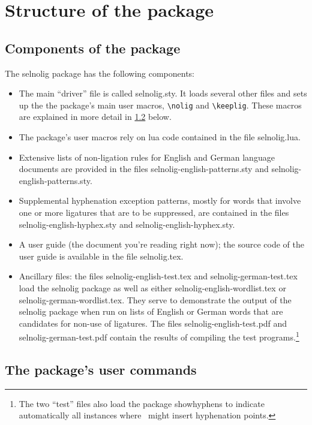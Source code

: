 \documentclass[11pt]{article}
\newcommand{\pkg}[1]{\textsf{#1}}
\newcommand{\cmmd}[1]{\texttt{\textbackslash #1}}
\begin{document}
\section{Structure of the package}

\subsection{Components of the package}

The \pkg{selnolig} package has the following components:
\begin{itemize}
\item The main \enquote{driver} file is called \pkg{selnolig.sty}. It loads several other files and sets up the the package's main user macros, \cmmd{nolig} and \cmmd{keeplig}. These macros are explained in more detail in \cref{sec:syntax} below.
\item The package's user macros rely on lua code contained in the file \pkg{selnolig.lua}. 
\item Extensive lists of non-ligation rules for English and German language documents are provided in the files \pkg{selnolig-english-patterns.sty} and \pkg{selnolig-english-patterns.sty}. 
\item Supplemental hyphenation exception patterns, mostly for words that involve one or more ligatures that are to be suppressed, are contained in the files \pkg{selnolig-english-hyphex.sty} and \pkg{selnolig-english-hyphex.sty}.
\item A user guide (the document you're reading right now); the source code of the user guide is available in the file \pkg{selnolig.tex}. 

\item Ancillary files: the files \pkg{selnolig-english-test.tex} and \pkg{selnolig-german-test.tex} load the \pkg{selnolig} package as well as either \pkg{selnolig-english-wordlist.tex} or \pkg{selnolig-german-wordlist.tex}. They serve to demonstrate the output of the \pkg{selnolig} package when run on lists of English or German words that are candidates for non-use of ligatures. The files \pkg{selnolig-english-test.pdf} and \pkg{selnolig-german-test.pdf} contain the results of compiling the test programs.\footnote{The two \enquote{test} files also load the package \pkg{showhyphens} to indicate automatically all instances where \LuaLaTeX\ might insert hyphenation points.}

\end{itemize}


\subsection{The package's user commands} \label{sec:syntax}
\end{document}
